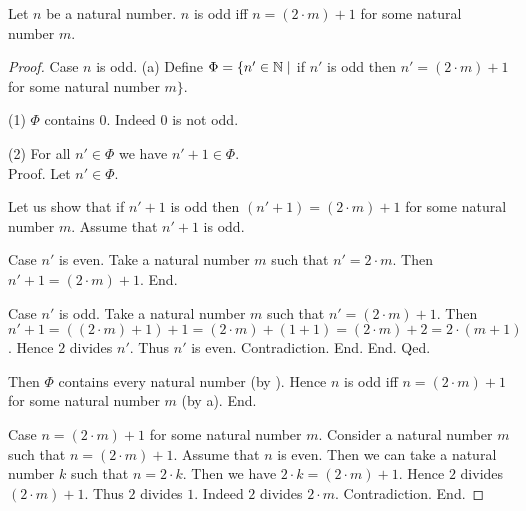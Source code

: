 \documentclass[10pt]{article}
\begin{document}
  \begin{forthel}
    \begin{proposition}[id=ARITHMETIC_15_1023512547854265,printid]
      Let $n$ be a natural number.
      $n$ is odd iff $n = (2 \cdot m) + 1$ for some natural number $m$.
    \end{proposition}
    \begin{proof}
      Case $n$ is odd.
        (a) Define $\Phi = \{ n' \in \mathbb{N} \mid$ if $n'$ is odd then $n' = (2 \cdot m) + 1$ for some natural number $m \}$.

        (1) $\Phi$ contains $0$.
        Indeed $0$ is not odd.

        (2) For all $n' \in \Phi$ we have $n' + 1 \in \Phi$. \\
        Proof.
          Let $n' \in \Phi$.

          Let us show that if $n' + 1$ is odd then $(n' + 1) = (2 \cdot m) + 1$ for some natural number $m$.
            Assume that $n' + 1$ is odd.

            Case $n'$ is even.
              Take a natural number $m$ such that $n' = 2 \cdot m$.
              Then $n' + 1 = (2 \cdot m) + 1$.
            End.

            Case $n'$ is odd.
              Take a natural number $m$ such that $n' = (2 \cdot m) + 1$.
              Then $n' + 1
                = ((2 \cdot m) + 1) + 1
                = (2 \cdot m) + (1 + 1)
                = (2 \cdot m) + 2
                = 2 \cdot (m + 1)$.
              Hence $2$ divides $n'$.
              Thus $n'$ is even.
              Contradiction.
            End.
          End.
        Qed.

        Then $\Phi$ contains every natural number (by ).
        Hence $n$ is odd iff $n = (2 \cdot m) + 1$ for some natural number $m$ (by a).
      End.

      Case $n = (2 \cdot m) + 1$ for some natural number $m$.
        Consider a natural number $m$ such that $n = (2 \cdot m) + 1$.
        Assume that $n$ is even.
        Then we can take a natural number $k$ such that $n = 2 \cdot k$.
        Then we have $2 \cdot k = (2 \cdot m) + 1$.
        Hence $2$ divides $(2 \cdot m) + 1$.
        Thus $2$ divides $1$.
        Indeed $2$ divides $2 \cdot m$.
        Contradiction.
      End.
    \end{proof}
  \end{forthel}
\end{document}
